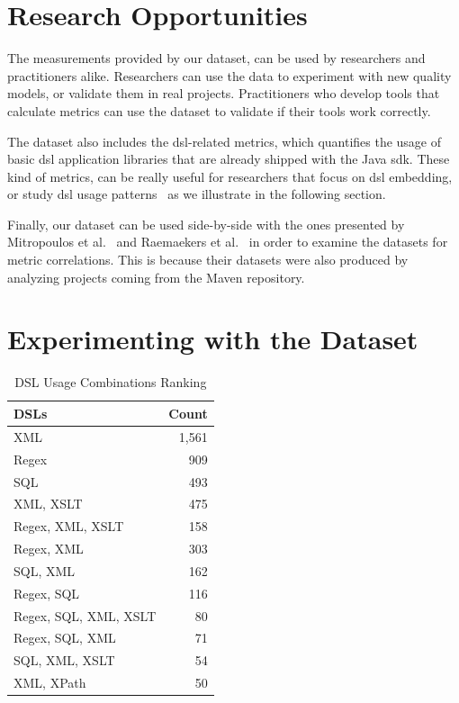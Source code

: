 \documentclass{sig-alternate}
\begin{document}
\section{Research Opportunities}
\label{sec:research-opportunities}

The measurements provided by our dataset, can be used by researchers and practitioners alike. Researchers can use the data to experiment with new quality models, or validate them in real projects. Practitioners who develop tools that calculate metrics can use the dataset to validate if their tools work correctly.

The dataset also includes the {\sc dsl}-related metrics, which quantifies the usage of basic {\sc dsl} application libraries that are already shipped with the Java {\sc sdk}. These kind of metrics, can be really useful for researchers that focus on {\sc dsl} embedding, or study {\sc dsl} usage patterns~\cite{KARA14} as we illustrate in the following section.

Finally, our dataset can be used side-by-side with the ones presented by Mitropoulos et al.~\cite{HP04} and Raemaekers et al.~\cite{RDV13} in order to examine the datasets for metric correlations. This is because their datasets were also produced by analyzing projects coming from the Maven repository.

\section{Experimenting with the Dataset}
\label{sec:dsl}

\begin{table}
\centering
\caption{DSL Usage Combinations Ranking}
\label{tbl:dsl-top-usage}
\begin{tabular}{l r}
 \hline
\textbf{DSLs} & \textbf{Count}\\
\hline
XML & 1,561\\
Regex & 909\\
SQL & 493\\
XML, XSLT & 475\\
Regex, XML, XSLT & 158\\
Regex, XML & 303\\
SQL, XML & 162\\
Regex, SQL & 116\\
Regex, SQL, XML, XSLT & 80\\
Regex, SQL, XML & 71\\
SQL, XML, XSLT & 54\\
XML, XPath & 50\\
\hline
\end{tabular}
\end{table}
\end{document}
